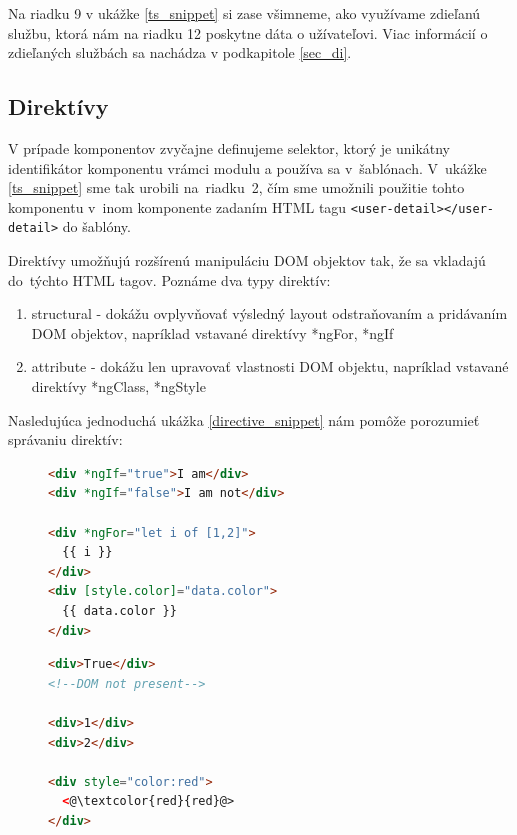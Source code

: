 \documentclass[
  digital, %
  twoside, %
  notable,   %
  nolof,   %
  nolot,   %
]{fithesis3}
\begin{document}
Na riadku 9 v ukážke \ref{ts_snippet} si zase všimneme, ako využívame zdieľanú službu, ktorá nám na riadku 12 poskytne dáta o užívateľovi. Viac informácií o zdieľaných službách sa nachádza v podkapitole \ref{sec_di}.

\subsection{Direktívy}
\label{sec_directives}
V prípade komponentov zvyčajne definujeme selektor, ktorý je unikátny identifikátor komponentu vrámci modulu a používa sa v~šablónach. V~ukážke \ref{ts_snippet} sme tak urobili na~riadku~2, čím sme umožnili použitie tohto komponentu v~inom komponente zadaním HTML tagu \texttt{<user-detail></user-detail>} do šablóny.

Direktívy umožňujú rozšírenú manipuláciu DOM objektov tak, že sa vkladajú do~týchto HTML tagov. Poznáme dva typy direktív\cite{angular}:
\begin{enumerate}
\item structural - dokážu ovplyvňovať výsledný layout odstraňovaním a pridávaním DOM objektov, napríklad vstavané direktívy *ngFor, *ngIf
\item attribute - dokážu len upravovať vlastnosti DOM objektu, napríklad vstavané direktívy *ngClass, *ngStyle
\end{enumerate}

Nasledujúca jednoduchá ukážka \ref{directive_snippet} nám pomôže porozumieť správaniu direktív:
\begin{figure}[H]
 \centering
 \begin{minipage}{.59\textwidth}

  \centering
  \begin{lstlisting}[language=HTML,caption={Direktívy použité v šalóne (vľavo) a ako ich vo~výsledku vníma prehliadač (vpravo)},label=directive_snippet]
<div *ngIf="true">I am</div>
<div *ngIf="false">I am not</div>

<div *ngFor="let i of [1,2]">
  {{ i }}
</div>
<div [style.color]="data.color">
  {{ data.color }}
</div>
  \end{lstlisting}

 \end{minipage}
 \begin{minipage}{.39\textwidth}

  \centering
  \begin{lstlisting}[language=HTML,numbers=none,xleftmargin=0em]
<div>True</div>
<!--DOM not present-->

<div>1</div>
<div>2</div>

<div style="color:red">
  <@\textcolor{red}{red}@>
</div>
  \end{lstlisting}
 
 \end{minipage}
\end{figure}
\end{document}
